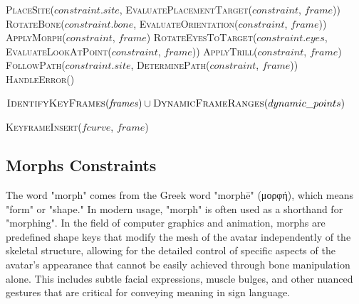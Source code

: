 \documentclass[../../main.tex]{subfiles}
\begin{document}
\begin{algorithm}
\begin{algorithmic}[1]
                \State \textsc{PlaceSite}($constraint.site$, \textsc{EvaluatePlacementTarget}($constraint$, $frame$))
                \State \textsc{RotateBone}($constraint.bone$, \textsc{EvaluateOrientation}($constraint$, $frame$))
                \State \textsc{ApplyMorph}($constraint$, $frame$)
                \State \textsc{RotateEyesToTarget}($constraint.eyes$, \textsc{EvaluateLookAtPoint}($constraint$, $frame$))
                \State \textsc{ApplyTrill}($constraint$, $frame$)
                \State \textsc{FollowPath}($constraint.site$, \textsc{DeterminePath}($constraint$, $frame$))
            \Else
                \State \textsc{HandleError}()
            \EndIf
        \EndProcedure
        
            \State \Return $\textsc{IdentifyKeyFrames}(\mathit{frames}) \cup \textsc{DynamicFrameRanges}(dynamic\_points)$
        \EndProcedure
        
                \State \textsc{KeyframeInsert}($fcurve$, $frame$)
            \EndFor
        \EndProcedure
    \end{algorithmic}
\end{algorithm}

\subsection{Morphs Constraints}
\label{subsec:morph_constraints}

The word "morph" comes from the Greek word "morphē" (μορφή), which means "form" or "shape." In modern usage, "morph" is often used as a shorthand for "morphing". In the field of computer graphics and animation, morphs are predefined shape keys that modify the mesh of the avatar independently of the skeletal structure, allowing for the detailed control of specific aspects of the avatar's appearance that cannot be easily achieved through bone manipulation alone. This includes subtle facial expressions, muscle bulges, and other nuanced gestures that are critical for conveying meaning in sign language.
\end{document}
